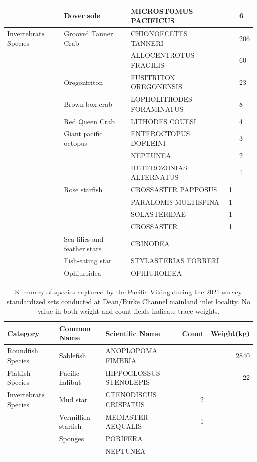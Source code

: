 \documentclass[12pt]{article}\usepackage[]{graphicx}\usepackage[]{color}
\begin{document}
\begin{table}[!h]
\begin{tabular}[t]{lllrl}
 & Dover sole & MICROSTOMUS PACIFICUS &  & 6\\
\midrule
Invertebrate Species & Grooved Tanner Crab & CHIONOECETES TANNERI &  & 206\\
 &  & ALLOCENTROTUS FRAGILIS &  & 60\\
 & Oregontriton & FUSITRITON OREGONENSIS &  & 23\\
 & Brown box crab & LOPHOLITHODES FORAMINATUS &  & 8\\
 & Red Queen Crab & LITHODES COUESI &  & 4\\
 & Giant pacific octopus & ENTEROCTOPUS DOFLEINI &  & 3\\
 &  & NEPTUNEA &  & 2\\
 &  & HETEROZONIAS ALTERNATUS &  & 1\\
 & Rose starfish & CROSSASTER PAPPOSUS & 1 & \\
 &  & PARALOMIS MULTISPINA & 1 & \\
 &  & SOLASTERIDAE & 1 & \\
 &  & CROSSASTER & 1 & \\
 & Sea lilies and feather stars & CRINODEA &  & \\
 & Fish-eating star & STYLASTERIAS FORRERI &  & \\
 & Ophiuroidea & OPHIUROIDEA &  & \\
\bottomrule
\end{tabular}
\end{table}

\begin{table}[!h]

\caption{\label{tab:table5}Summary of species captured by the Pacific Viking during the 2021 survey standardized sets conducted at Dean/Burke Channel mainland inlet locality. No value in both weight and count fields indicate trace weights.}
\fontsize{8}{10}\selectfont
\begin{tabular}[t]{lllrr}
\toprule
\textbf{Category} & \textbf{Common Name} & \textbf{Scientific Name} & \textbf{Count} & \textbf{Weight(kg)}\\
\midrule
Roundfish Species & Sablefish & ANOPLOPOMA FIMBRIA &  & 2840\\
\midrule
Flatfish Species & Pacific halibut & HIPPOGLOSSUS STENOLEPIS &  & 22\\
\midrule
Invertebrate Species & Mud star & CTENODISCUS CRISPATUS & 2 & \\
 & Vermillion starfish & MEDIASTER AEQUALIS & 1 & \\
 & Sponges & PORIFERA &  & \\
 &  & NEPTUNEA &  & \\
\bottomrule
\end{tabular}
\end{table}
\clearpage
\end{document}
